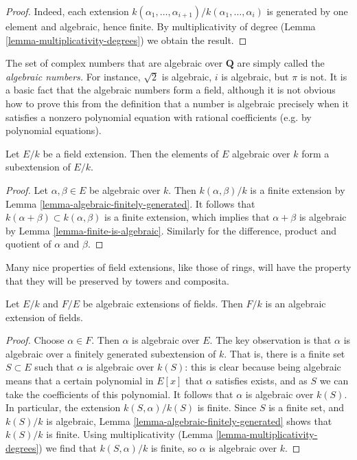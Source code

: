 \begin{proof}
Indeed, each extension
$k(\alpha_{1}, \dots, \alpha_{i+1})/k(\alpha_1, \dots, \alpha_{i})$
is generated by one element and algebraic, hence finite.
By multiplicativity of degree (Lemma \ref{lemma-multiplicativity-degrees})
we obtain the result.
\end{proof}

\noindent
The set of complex numbers that are algebraic over $\mathbf{Q}$ are simply
called the {\it algebraic numbers.} For instance, $\sqrt{2}$ is algebraic,
$i$ is algebraic, but $\pi$ is not.
It is a basic fact that the algebraic numbers form a field, although it is not
obvious how to prove this from the definition that a number is algebraic
precisely when it satisfies a nonzero polynomial equation with rational
coefficients (e.g. by polynomial equations).

\begin{lemma}
\label{lemma-algebraic-elements}
Let $E/k$ be a field extension. Then the elements of $E$ algebraic over $k$
form a subextension of $E/k$.
\end{lemma}

\begin{proof}
Let $\alpha, \beta \in E$ be algebraic over $k$. Then $k(\alpha, \beta)/k$
is a finite extension by Lemma \ref{lemma-algebraic-finitely-generated}.
It follows that $k(\alpha + \beta) \subset k(\alpha, \beta)$ is a finite
extension, which implies that $\alpha + \beta$ is algebraic by
Lemma \ref{lemma-finite-is-algebraic}. Similarly for the difference,
product and quotient of $\alpha$ and $\beta$.
\end{proof}

\noindent
Many nice properties of field extensions, like those of rings, will have the
property that they will be preserved by towers and composita.

\begin{lemma}
\label{lemma-algebraic-permanence}
Let $E/k$ and $F/E$ be algebraic extensions of fields. Then $F/k$ is an
algebraic extension of fields.
\end{lemma}

\begin{proof}
Choose $\alpha \in F$. Then $\alpha$ is algebraic over $E$.
The key observation is that $\alpha$ is algebraic over a
finitely generated subextension of $k$.
That is, there is a finite set $S \subset E$ such that $\alpha $ is algebraic
over $k(S)$: this is clear because being algebraic means that a certain
polynomial in $E[x]$ that $\alpha$ satisfies exists, and as $S$ we can take the
coefficients of this polynomial. It follows that $\alpha$ is algebraic over
$k(S)$. In particular, the extension $k(S, \alpha)/ k(S)$ is finite.
Since $S$ is a finite set, and $k(S)/k$ is algebraic,
Lemma \ref{lemma-algebraic-finitely-generated} shows that
$k(S)/k$ is finite. Using multiplicativity
(Lemma \ref{lemma-multiplicativity-degrees})
we find that $k(S,\alpha)/k$ is finite, so $\alpha$ is algebraic over $k$.
\end{proof}


